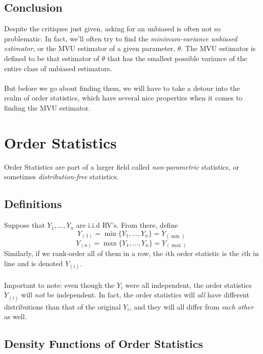 \documentclass[a4paper,12pt]{scrartcl}
\begin{document}
\subsection{Conclusion}

Despite the critiques just given, asking for an unbiased is often
not so problematic.  In fact, we'll often try to find
the \emph{minimum-variance unbiased estimator}, or the MVU estimator
of a given parameter, $\theta$.  The MVU estimator is defined to be that
estimator of $\theta$ that has the smallest possible
variance of the entire class of unbiased estimators.
\\
\\
But before we go about finding them, we will have to take a detour
into the realm of order statistics, which have several nice properties
when it comes to finding the MVU estimator.

\newpage

\section{Order Statistics}

Order Statistics are part of a larger field called
\emph{non-parametric} statistics, or sometimes \emph{distribution-free}
statistics.


\subsection{Definitions}

Suppose that $Y_1, \ldots, Y_n$ are i.i.d RV's. From there, define
   \[ Y_{(1)} = \min\{Y_1, \ldots, Y_n\} = Y_{(\min)}  \]
   \[ Y_{(n)} = \max\{Y_1, \ldots, Y_n\} = Y_{(\max)}  \]
Similarly, if we rank-order all of them in a row, the $i$th order
statistic is the $i$th in line and is denoted $Y_{(i)}$.
\\
\\
Important to note: even though the $Y_i$ were all independent, the order
statistics $Y_{(i)}$ will \emph{not} be independent.  In fact, the
order statistics will \emph{all} have different distributions than
that of the original $Y_i$, and they will all differ from \emph{each
other} as well.

\subsection{Density Functions of Order Statistics}
\end{document}
